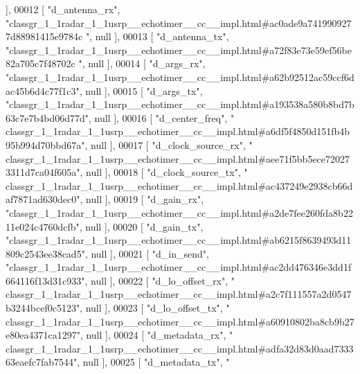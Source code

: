 \begin{DoxyCode}
      ],
00012     [ \textcolor{stringliteral}{"d\_antenna\_rx"}, \textcolor{stringliteral}{"classgr\_1\_1radar\_1\_1usrp\_\_echotimer\_\_cc\_\_impl.html#ac0ade9a7419909277d88981415e9784c
      "}, null ],
00013     [ \textcolor{stringliteral}{"d\_antenna\_tx"}, \textcolor{stringliteral}{"classgr\_1\_1radar\_1\_1usrp\_\_echotimer\_\_cc\_\_impl.html#a72f83e73e59ef56be82a705c7f48702c
      "}, null ],
00014     [ \textcolor{stringliteral}{"d\_args\_rx"}, \textcolor{stringliteral}{"classgr\_1\_1radar\_1\_1usrp\_\_echotimer\_\_cc\_\_impl.html#a62b92512ac59ccf6dac45b6d4c77f1c3"}, 
      null ],
00015     [ \textcolor{stringliteral}{"d\_args\_tx"}, \textcolor{stringliteral}{"classgr\_1\_1radar\_1\_1usrp\_\_echotimer\_\_cc\_\_impl.html#a193538a580b8bd7b63c7e7b4bd06d77d"}, 
      null ],
00016     [ \textcolor{stringliteral}{"d\_center\_freq"}, \textcolor{stringliteral}{"
      classgr\_1\_1radar\_1\_1usrp\_\_echotimer\_\_cc\_\_impl.html#a6df5f4850d151fb4b95b994d70bbd67a"}, null ],
00017     [ \textcolor{stringliteral}{"d\_clock\_source\_rx"}, \textcolor{stringliteral}{"
      classgr\_1\_1radar\_1\_1usrp\_\_echotimer\_\_cc\_\_impl.html#aee71f5bb5ece720273311d7ca04f605a"}, null ],
00018     [ \textcolor{stringliteral}{"d\_clock\_source\_tx"}, \textcolor{stringliteral}{"
      classgr\_1\_1radar\_1\_1usrp\_\_echotimer\_\_cc\_\_impl.html#ac437249e2938cb66daf7871ad630dec0"}, null ],
00019     [ \textcolor{stringliteral}{"d\_gain\_rx"}, \textcolor{stringliteral}{"classgr\_1\_1radar\_1\_1usrp\_\_echotimer\_\_cc\_\_impl.html#a2de7fee260fda8b2211e024c4760dcfb"}, 
      null ],
00020     [ \textcolor{stringliteral}{"d\_gain\_tx"}, \textcolor{stringliteral}{"classgr\_1\_1radar\_1\_1usrp\_\_echotimer\_\_cc\_\_impl.html#ab6215f8639493d11809c2543ee38cad5"}, 
      null ],
00021     [ \textcolor{stringliteral}{"d\_in\_send"}, \textcolor{stringliteral}{"classgr\_1\_1radar\_1\_1usrp\_\_echotimer\_\_cc\_\_impl.html#ac2dd476346e3dd1f664116f13d31c933"}, 
      null ],
00022     [ \textcolor{stringliteral}{"d\_lo\_offset\_rx"}, \textcolor{stringliteral}{"
      classgr\_1\_1radar\_1\_1usrp\_\_echotimer\_\_cc\_\_impl.html#a2c7f111557a2d0547b3244bcef0c5123"}, null ],
00023     [ \textcolor{stringliteral}{"d\_lo\_offset\_tx"}, \textcolor{stringliteral}{"
      classgr\_1\_1radar\_1\_1usrp\_\_echotimer\_\_cc\_\_impl.html#a60910802ba8cb9b27e80ea4371ca1297"}, null ],
00024     [ \textcolor{stringliteral}{"d\_metadata\_rx"}, \textcolor{stringliteral}{"
      classgr\_1\_1radar\_1\_1usrp\_\_echotimer\_\_cc\_\_impl.html#adfa32d83d0aad733363eaefc7fab7544"}, null ],
00025     [ \textcolor{stringliteral}{"d\_metadata\_tx"}, \textcolor{stringliteral}{"
}
\end{DoxyCode}
